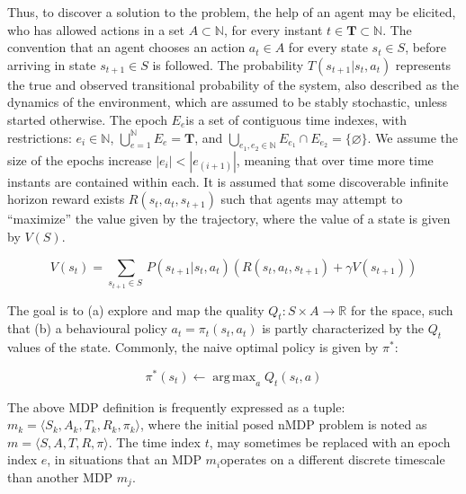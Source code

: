 \documentclass[compsoc,journal,letterpaper,10pt,draftclsnofoot,onecolumn]{IEEEtran}
\DeclareMathOperator*{\argmax}{arg\,max}
\begin{document}
Thus, to discover a solution to the problem, the help of an agent may be
elicited, who has allowed actions in a set \(A \subset \mathbb{N}\), for
every instant \(t \in \mathbf{T}\subset\mathbb{N}\). The
convention that an agent chooses an action \(a_{t} \in A\) for every
state \(s_{t} \in S\), before arriving in state \(s_{t + 1} \in S\) is
followed. The probability \(T\left( s_{t + 1} |s_{t}, a_{t}\right)\)
represents the true and observed transitional probability of the system,
also described as the dynamics of the environment, which are assumed to
be stably stochastic, unless started otherwise. The epoch \(E_{e}\)is a
set of contiguous time indexes, with restrictions:
\(e_{i}\in\mathbb{N}\), \(\bigcup_{e = 1}^{\mathbb{N}}E_{e} = \mathbf{T}\), and
\(\bigcup_{e_{1},e_{2}\in\mathbb{ N}}{E_{e_{1}} \cap E_{e_{2}}} = \{\varnothing\}\).
We assume the size of the epochs increase
\(\left| e_{i} \right| < \left| e_{(i + 1)} \right|\), meaning that
over time more time instants are contained within each. It is assumed
that some discoverable infinite horizon reward exists
\(R\left( s_{t}, a_{t}, s_{t + 1} \right)\) such that agents may attempt
to ``maximize'' the value given by the trajectory, where the value of a
state is given by \(V\left( S \right).\)

\begin{equation}
V\left( s_{t} \right) = \sum_{s_{t + 1} \in S\ }{P\left( s_{t + 1}|s_{t},a_{t} \right)\left( R\left( s_{t},a_{t},s_{t + 1} \right) + \gamma V\left( s_{t + 1} \right) \right)}
\end{equation}

The goal is to (a) explore and map the quality
\(Q_{t}:S \times A\mathbb{\rightarrow R}\) for the space, such that (b)
a behavioural policy \(a_{t} = \pi_{t}(s_{t}, a_{t})\) is partly
characterized by the \(Q_{t}\) values of the state. Commonly, the naive
optimal policy is given by \(\pi^{*}\):

\begin{equation}
\pi^{*}\left( s_{t} \right) \leftarrow \argmax_{a}{Q_{t}(s_{t},a)} 
\end{equation}

The above MDP definition is frequently expressed as a tuple:
\(m_{k} = \langle S_{k}, A_{k}, T_{k}, R_{k}, \pi_{k} \rangle\), where the initial posed
nMDP problem is noted as
\(m = \langle S, A, T, R,\pi \rangle \). The time index
\(t\), may sometimes be replaced with an epoch index \(e\), in
situations that an MDP \(m_{i}\)operates on a different discrete
timescale than another MDP \(m_{j}\).
\end{document}
